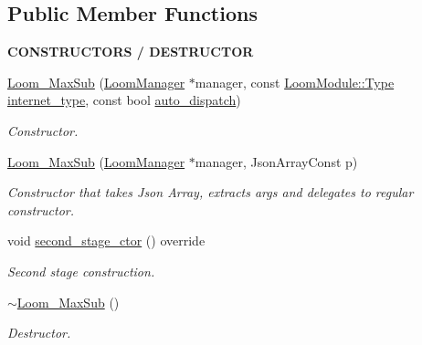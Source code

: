\subsection*{Public Member Functions}
\begin{Indent}{\bf C\+O\+N\+S\+T\+R\+U\+C\+T\+O\+RS / D\+E\+S\+T\+R\+U\+C\+T\+OR}\par
\begin{DoxyCompactItemize}
\item 
\hyperlink{class_loom___max_sub_a9d30bf2d064970e8513009c8556aabc2}{Loom\+\_\+\+Max\+Sub} (\hyperlink{class_loom_manager}{Loom\+Manager} $\ast$manager, const \hyperlink{class_loom_module_aee91d0a75140d51ee428fc2d4417d865}{Loom\+Module\+::\+Type} \hyperlink{class_loom_subscribe_plat_ac1f89a414dd68151b156c3d76a5cbffe}{internet\+\_\+type}, const bool \hyperlink{class_loom___max_sub_adb1bf0c7394ff4ebaa1e893fb55356ff}{auto\+\_\+dispatch})
\begin{DoxyCompactList}\small\item\em Constructor. \end{DoxyCompactList}\item 
\hyperlink{class_loom___max_sub_abbdefe05ce2bf306fe224d56f2b67aa9}{Loom\+\_\+\+Max\+Sub} (\hyperlink{class_loom_manager}{Loom\+Manager} $\ast$manager, Json\+Array\+Const p)
\begin{DoxyCompactList}\small\item\em Constructor that takes Json Array, extracts args and delegates to regular constructor. \end{DoxyCompactList}\item 
void \hyperlink{class_loom___max_sub_a8cc7cbe1313118bd7773e5f023eb7bb2}{second\+\_\+stage\+\_\+ctor} () override
\begin{DoxyCompactList}\small\item\em Second stage construction. \end{DoxyCompactList}\item 
\hyperlink{class_loom___max_sub_a9f34cd71b9fbace2702d25c49ef64c00}{$\sim$\+Loom\+\_\+\+Max\+Sub} ()
\begin{DoxyCompactList}\small\item\em Destructor. \end{DoxyCompactList}\end{DoxyCompactItemize}
\end{Indent}
